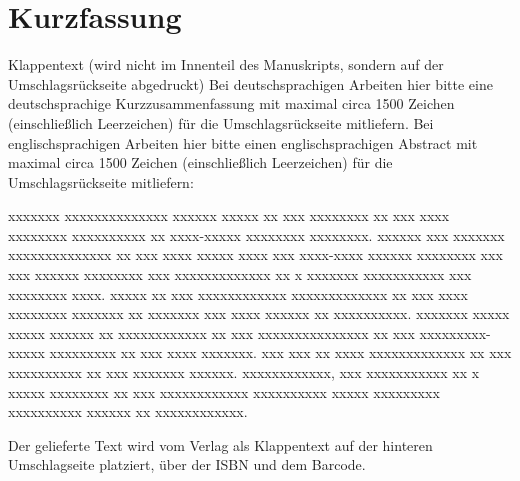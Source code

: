 %
\chapter*{Kurzfassung}
\thispagestyle{empty}
Klappentext (wird nicht im Innenteil des Manuskripts, sondern auf der Umschlagsrückseite abgedruckt)
Bei deutschsprachigen Arbeiten hier bitte eine deutschsprachige Kurzzusammenfassung mit maximal circa 1500 Zeichen (einschließlich Leerzeichen) für die Umschlagsrückseite mitliefern.
Bei englischsprachigen Arbeiten hier bitte einen englischsprachigen Abstract mit maximal circa 1500 Zeichen (einschließlich Leerzeichen) für die Umschlagsrückseite mitliefern:

xxxxxxx xxxxxxxxxxxxxx xxxxxx xxxxx xx xxx xxxxxxxx xx xxx xxxx xxxxxxxx xxxxxxxxxx xx xxxx-xxxxx xxxxxxxx xxxxxxxx. xxxxxx xxx xxxxxxx xxxxxxxxxxxxxx xx xxx xxxx xxxxx xxxx xxx xxxx-xxxx xxxxxx xxxxxxxx xxx xxx xxxxxx xxxxxxxx xxx xxxxxxxxxxxxx xx x xxxxxxx xxxxxxxxxxx xxx xxxxxxxx xxxx. xxxxx xx xxx xxxxxxxxxxxx xxxxxxxxxxxxx xx xxx xxxx xxxxxxxx xxxxxxx xx xxxxxxx xxx xxxx xxxxxx xx xxxxxxxxxx. xxxxxxx xxxxx xxxxx xxxxxx xx xxxxxxxxxxxx xx xxx xxxxxxxxxxxxxxx xx xxx xxxxxxxxx-xxxxx xxxxxxxxx xx xxx xxxx xxxxxxx. xxx xxx xx xxxx xxxxxxxxxxxxx xx xxx xxxxxxxxxx xx xxx xxxxxxx xxxxxx. xxxxxxxxxxxx, xxx xxxxxxxxxxx xx x xxxxx xxxxxxxx xx xxx xxxxxxxxxxxx xxxxxxxxxx xxxxx xxxxxxxxx xxxxxxxxxx xxxxxx xx xxxxxxxxxxxx.

Der gelieferte Text wird vom Verlag als Klappentext auf der hinteren Umschlagseite platziert, über der ISBN und dem Barcode.
